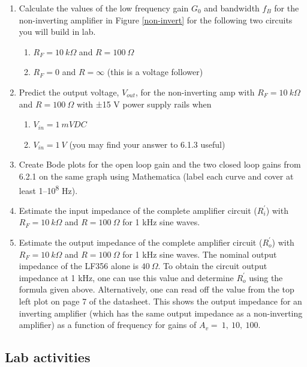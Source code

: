 \documentclass[10pt]{PhysLab1C} %
\begin{document}
\begin{enumerate}
\item
  Calculate the values of the low frequency gain \(G_0\) and bandwidth
  \(f_B\) for the non-inverting amplifier in Figure \ref{non-invert} for the following
  two circuits you will build in lab.

  \begin{enumerate}
  \item
    \(R_F = 10 ~k\Omega\) and \(R = 100 ~\Omega\)
  \item
    \(R_F = 0\) and \(R = \infty\) (this is a voltage follower)
  \end{enumerate}
\item
  Predict the output voltage, \(V_{out}\), for the non-inverting amp
  with \(R_F = 10 ~k\Omega\) and \(R = 100 ~\Omega\) with ±15 V power supply rails
  when

  \begin{enumerate}
  \item
    \(V_{in} = 1~ mVDC \)
  \item
    \(V_{in} = 1 ~V\) (you may find your answer to 6.1.3 useful)
  \end{enumerate}
\item
  Create Bode plots for the open loop gain and the two closed loop gains
  from 6.2.1 on the same graph using Mathematica (label each curve and
  cover at least 1--10\textsuperscript{8} Hz).
\item
  Estimate the input impedance of the complete amplifier circuit
  (\(R_i^{'}\)) with \(R_F = 10 ~k\Omega\) and \(R = 100 ~\Omega\) for 1 kHz sine
  waves.
\item
  Estimate the output impedance of the complete amplifier circuit
  (\(R_o^{'}\)) with \(R_F = 10 ~k\Omega\) and \(R = 100 ~\Omega\) for 1 kHz sine
  waves. The nominal output impedance of the LF356 alone is $40~\Omega$. To
  obtain the circuit output impedance at 1 kHz, one can use this value
  and determine \(R_o^{'}\) using the formula given above. Alternatively, one
  can read off the value from the top left plot on page 7 of the
  datasheet. This shows the output impedance for an inverting amplifier
  (which has the same output impedance as a non-inverting amplifier) as
  a function of frequency for gains of \(A_v=~1,~10,~100\).
\end{enumerate}

\subsection{Lab activities}
\end{document}
